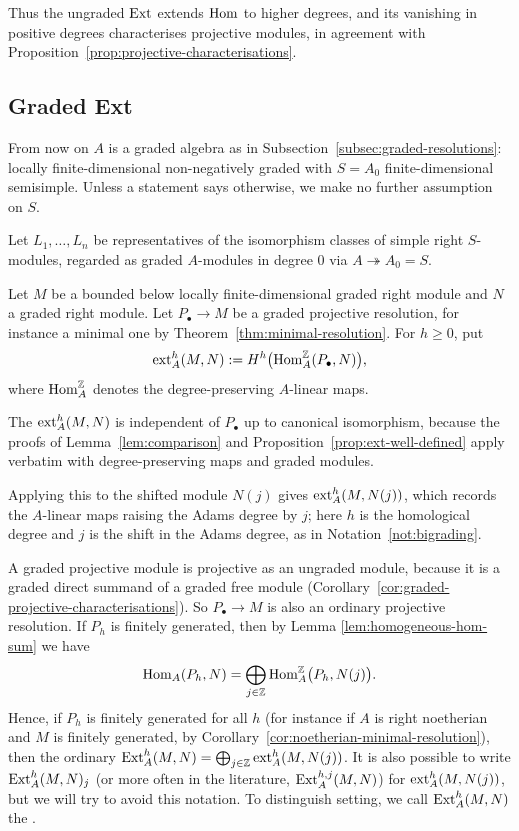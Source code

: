 Thus the ungraded $\operatorname{Ext}\nolimits$ extends $\operatorname{Hom}\nolimits$ to higher degrees, and its vanishing in positive degrees characterises projective modules, in agreement with Proposition~\ref{prop:projective-characterisations}.


\subsection{Graded Ext}\label{subsec:graded-ext}

From now on $A$ is a graded algebra as in Subsection~\ref{subsec:graded-resolutions}: locally finite-dimensional non-negatively graded with $S=A_0$ finite-dimensional semisimple.
Unless a statement says otherwise, we make no further assumption on $S$.

Let $L_1,\ldots,L_n$ be representatives of the isomorphism classes of simple right $S$-modules, regarded as graded $A$-modules in degree $0$ via $A\twoheadrightarrow A_0=S$.

\begin{definition}\label{def:graded-ext}
Let $M$ be a bounded below locally finite-dimensional graded right module and $N$ a graded right module.
Let $P_\bullet\to M$ be a graded projective resolution, for instance a minimal one by Theorem~\ref{thm:minimal-resolution}.
For $h\geq0$, put
\[
\operatorname{ext}\nolimits_A^h(M,N):=H^h\bigl(\operatorname{Hom}\nolimits_A^{\mathbb{Z}}(P_\bullet,N)\bigr),
\]
where $\operatorname{Hom}\nolimits_A^{\mathbb{Z}}$ denotes the degree-preserving $A$-linear maps.
\end{definition}

The  $\operatorname{ext}\nolimits_A^h(M,N)$ is independent of $P_\bullet$ up to canonical isomorphism, because the proofs of Lemma~\ref{lem:comparison} and Proposition~\ref{prop:ext-well-defined} apply verbatim with degree-preserving maps and graded modules.

Applying this to the shifted module $N(j)$ gives $\operatorname{ext}\nolimits_A^h(M,N(j))$, which records the $A$-linear maps raising the Adams degree by $j$; here $h$ is the homological degree and $j$ is the shift in the Adams degree, as in Notation~\ref{not:bigrading}.

\begin{remark}\label{rem:graded-ext-ungraded}
A graded projective module is projective as an ungraded module, because it is a graded direct summand of a graded free module (Corollary~\ref{cor:graded-projective-characterisations}).
So $P_\bullet\to M$ is also an ordinary projective resolution.
If $P_h$ is finitely generated, then by Lemma \ref{lem:homogeneous-hom-sum} we have
\[
\operatorname{Hom}\nolimits_A(P_h,N)=\bigoplus_{j\in\mathbb{Z}}\operatorname{Hom}\nolimits_A^{\mathbb{Z}}\bigl(P_h,N(j)\bigr).
\]
Hence, if $P_h$ is finitely generated for all $h$ (for instance if $A$ is right noetherian and $M$ is finitely generated, by Corollary~\ref{cor:noetherian-minimal-resolution}), then the ordinary $\operatorname{Ext}\nolimits_A^h(M,N)=\bigoplus_{j\in\mathbb{Z}}\operatorname{ext}\nolimits_A^h(M,N(j))$.
It is also possible to write $\operatorname{Ext}\nolimits_A^h(M,N)_j$ (or more often in the literature, $\operatorname{Ext}\nolimits_A^{h,j}(M,N)$) for $\operatorname{ext}\nolimits_A^h(M,N(j))$, but we will try to avoid this notation.
To distinguish setting, we call $\operatorname{Ext}\nolimits_A^h(M,N)$ the .
\end{remark}


